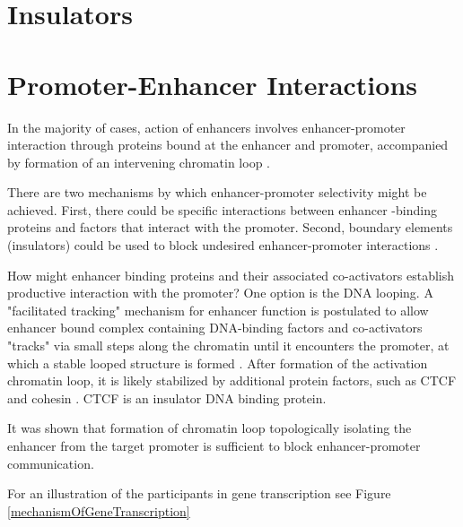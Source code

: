 \documentclass[12pt]{paper}
\begin{document}
\section{Insulators}

\section{Promoter-Enhancer Interactions}
In the majority of cases, action of enhancers involves enhancer-promoter interaction through proteins bound at the enhancer and promoter, accompanied by formation of an intervening chromatin loop \cite{Kulaeva12}.

There are two mechanisms by which enhancer-promoter  selectivity might be achieved. First, there could be specific interactions between enhancer -binding proteins and factors that interact with the promoter. Second, boundary elements (insulators) could be used to block undesired enhancer-promoter interactions \cite{Blackwood98}. 

How might enhancer binding proteins and their associated co-activators  establish productive interaction with the promoter? One option is the DNA looping. A "facilitated tracking" mechanism for enhancer function is postulated to allow enhancer bound complex containing DNA-binding factors and co-activators "tracks" via small steps along the chromatin until it encounters the promoter, at which a stable looped structure is formed \cite{Blackwood98}. After formation of the activation chromatin loop, it is likely stabilized by additional protein factors, such as CTCF and cohesin \cite{Kulaeva12}. CTCF is an insulator DNA binding protein. 

It was shown that formation of chromatin loop topologically isolating the enhancer from the target promoter is sufficient to block enhancer-promoter communication. 


For an illustration of the participants in gene transcription see Figure \ref{mechanismOfGeneTranscription}
\end{document}
